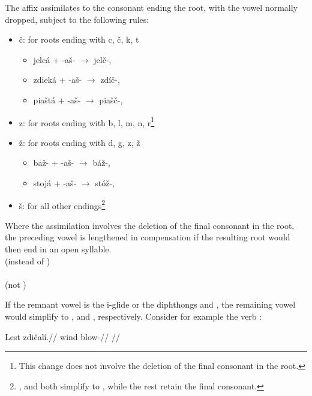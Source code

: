 The affix  assimilates to the consonant ending the root, with the vowel  normally dropped, subject to the following rules:
\begin{itemize}
	\item \v{c}: for roots ending with c, \v{c}, k, t
	\begin{itemize}
		\item jelc\'a + -a\v{s}- $\rightarrow$ jel\v{c}-, 
		\item zdiek\'a + -a\v{s}- $\rightarrow$ zd\'i\v{c}-, 
		\item pia\v{s}t\'a + -a\v{s}- $\rightarrow$ pia\v{s}\v{c}-, 
	\end{itemize}
	\item z: for roots ending with b, l, m, n, r\footnote{This change does not involve the deletion of the final consonant in the root.}
	\item \v{z}: for roots ending with d, g, z, \v{z}
	\begin{itemize}
		\item ba\v{z}- + -a\v{s}- $\rightarrow$ b\'a\v{z}-, 
		\item stoj\'a + -a\v{s}- $\rightarrow$ st\'o\v{z}-, 
	\end{itemize}
	\item \v{s}: for all other endings\footnote{ ,  and  both simplify to , while the rest retain the final consonant.}
\end{itemize}

Where the assimilation involves the deletion of the final consonant in the root, the preceding vowel is lengthened in compensation if the resulting root would then end in an open syllable.
\pex
{}\\
(instead of )\\
\xe
\pex
{}\\
(not )\\
\xe

If the remnant vowel is the i-glide  or the diphthongs  and , the remaining vowel would simplify to ,  and , respectively. Consider for example the verb  :

\pex
\begingl
\gla Lest zdi\v{c}al\'i.//
\glb wind blow-//
\glft {}//
\endgl
\xe

